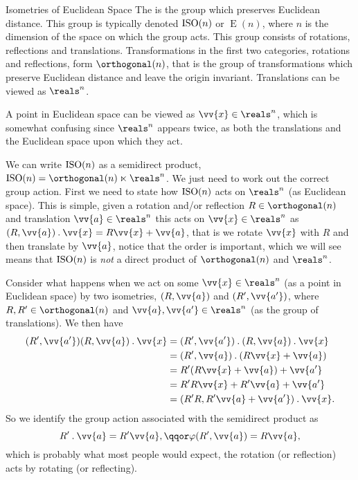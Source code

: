\begin{exm}{Isometries of Euclidean Space}{}
    The  is the group which preserves Euclidean distance.
    This group is typically denoted \(\operatorname{ISO}(n)\) or \(\mathop{\mathrm{E}}(n)\), where \(n\) is the dimension of the space on which the group acts.
    This group consists of rotations, reflections and translations.
    Transformations in the first two categories, rotations and reflections, form \(\orthogonal(n)\), that is the group of transformations which preserve Euclidean distance and leave the origin invariant.
    Translations can be viewed as \(\reals^n\).
    
    A point in Euclidean space can be viewed as \(\vv{x} \in \reals^n\), which is somewhat confusing since \(\reals^n\) appears twice, as both the translations and the Euclidean space upon which they act.
    
    We can write \(\operatorname{ISO}(n)\) as a semidirect product, \(\ISO(n) = \orthogonal(n) \ltimes \reals^n\).
    We just need to work out the correct group action.
    First we need to state how \(\operatorname{ISO}(n)\) acts on \(\reals^n\) (as Euclidean space).
    This is simple, given a rotation and/or reflection \(R \in \orthogonal(n)\) and translation \(\vv{a} \in \reals^n\) this acts on \(\vv{x} \in \reals^n\) as \((R, \vv{a}) \action \vv{x} = R\vv{x} + \vv{a}\), that is we rotate \(\vv{x}\) with \(R\) and then translate by \(\vv{a}\), notice that the order is important, which we will see means that \(\operatorname{ISO}(n)\) is \emph{not} a direct product of \(\orthogonal(n)\) and \(\reals^n\).
    
    Consider what happens when we act on some \(\vv{x} \in \reals^n\) (as a point in Euclidean space) by two isometries, \((R, \vv{a})\) and \((R', \vv{a'})\), where \(R, R' \in \orthogonal(n)\) and \(\vv{a}, \vv{a'} \in \reals^n\) (as the group of translations).
    We then have
    \begin{align}
        (R', \vv{a'})(R, \vv{a}) \action \vv{x} &= (R', \vv{a'}) \action (R, \vv{a}) \action \vv{x}\\
        &= (R', \vv{a}) \action (R\vv{x} + \vv{a})\\
        &= R'(R\vv{x} + \vv{a}) + \vv{a'}\\
        &= R'R\vv{x} + R'\vv{a} + \vv{a'}\\
        &= (R'R, R'\vv{a} + \vv{a'})\action \vv{x}.
    \end{align}
    So we identify the group action associated with the semidirect product as
    \begin{equation}
        R'\action \vv{a} = R'\vv{a}, \qqor \varphi(R', \vv{a}) = R\vv{a},
    \end{equation}
    which is probably what most people would expect, the rotation (or reflection) acts by rotating (or reflecting).
\end{exm}

